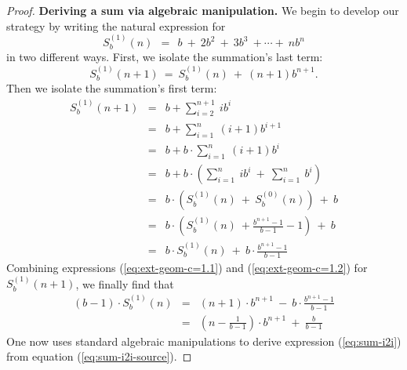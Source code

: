 \begin{proof}
{\bf Deriving a sum via algebraic manipulation.}
%
We begin to develop our strategy by writing the natural expression for
\[ S_b^{(1)}(n) \ \ = \ \ b \ + \ 2b^2 \ + \ 3 b^3 \ + \cdots + \ n b^n  \]
in two different ways.  First, we isolate the summation's last term:
\begin{equation}
\label{eq:ext-geom-c=1.1}
S_b^{(1)}(n+1) \ = \ S_b^{(1)}(n) \ + \ (n+1) b^{n+1}.
\end{equation}
Then we isolate the summation's first term:
\begin{eqnarray}
\nonumber
S_b^{(1)}(n+1)
     & = &
b + \sum_{i=2}^{n+1} \ i b^{i}  \\
\nonumber
& = &
b + \sum_{i=1}^n \ (i+1) b^{i+1}  \\
\nonumber
     & = &
b +  b \cdot \sum_{i=1}^n \ (i+1) b^i \\
\nonumber
     & = &
b + 
b \cdot \left(
\sum_{i=1}^n \ i b^i 
 \ + \
\sum_{i=1}^n \  b^i 
\right) \\
\nonumber
     & = &
b \cdot \left( S_b^{(1)}(n) \ + \ S_b^{(0)}(n) \right) \ + \ b \\
\nonumber
& = &
b \cdot \left( S_b^{(1)}(n) \ +  \frac{b^{n+1} -1}{b-1} -1 \right) \ + \ b \\
\label{eq:ext-geom-c=1.2}
    & = &
b \cdot S_b^{(1)}(n) \ + \ b \cdot \frac{b^{n+1} - 1}{b-1}
\end{eqnarray}
Combining expressions (\ref{eq:ext-geom-c=1.1}) and
(\ref{eq:ext-geom-c=1.2}) for $S_b^{(1)}(n+1)$, we
finally find that
\begin{eqnarray}
\nonumber
(b-1) \cdot S_b^{(1)}(n) & = &
(n+1) \cdot b^{n+1} \ - \ b \cdot \frac{b^{n+1} -1}{b-1} \\
\label{eq:sum-i2i-source}
 & = &
\left( n - \frac{1}{b-1} \right) \cdot b^{n+1} \ + \ \frac{b}{b-1}
\end{eqnarray}
One now uses standard algebraic manipulations to derive expression
(\ref{eq:sum-i2i}) from equation (\ref{eq:sum-i2i-source}).
\end{proof}


